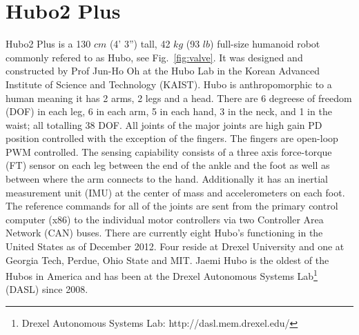 \section{Hubo2 Plus}
Hubo2 Plus is a 130 $cm$ (4' 3'') tall, 42 $kg$ (93 $lb$) full-size humanoid robot commonly refered to as Hubo, see Fig.~\ref{fig:valve}.  
It was designed and constructed by Prof Jun-Ho Oh at the Hubo Lab in the Korean Advanced Institute of Science and Technology (KAIST)\cite{hubo-first}.
Hubo is anthropomorphic to a human meaning it has 2 arms, 2 legs and a head.
There are 6 degreese of freedom (DOF) in each leg, 6 in each arm, 5 in each hand, 3 in the neck, and 1 in the waist; all totalling 38 DOF.
All joints of the major joints are high gain PD position controlled with the exception of the fingers.
The fingers are open-loop PWM controlled.
The sensing capiability consists of a three axis force-torque (FT) sensor on each leg between the end of the ankle and the foot as well as between where the arm connects to the hand.
Additionally it has an inertial measurement unit (IMU) at the center of mass and accelerometers on each foot.
The reference commands for all of the joints are sent from the primary control computer (x86) to the individual motor controllers via two Controller Area Network (CAN) buses.
There are currently eight Hubo's functioning in the United States as of December 2012.
Four reside at Drexel University and one at Georgia Tech, Perdue, Ohio State and MIT.
Jaemi Hubo is the oldest of the Hubos in America and has been at the Drexel Autonomous Systems Lab\footnote{Drexel Autonomous Systems Lab: http://dasl.mem.drexel.edu/} (DASL) since 2008\cite{jaemi-hubo-first}.



